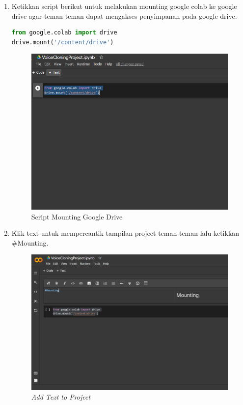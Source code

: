 \begin{enumerate}
\item Ketikkan script berikut untuk melakukan mounting google colab ke google drive agar teman-teman dapat mengakses penyimpanan pada google drive.
\begin{lstlisting}[language=Python, caption=Mounting Google Drive]
from google.colab import drive
drive.mount('/content/drive')
\end{lstlisting}

\begin{figure}[H]
    \centering
    \includegraphics[scale=0.35]{figures/colab3}
    \caption{Script Mounting Google Drive}
    \label{colab3}
\end{figure}

\item Klik text untuk mempercantik tampilan project teman-teman lalu ketikkan \#Mounting.
\begin{figure}[H]
    \centering
    \includegraphics[scale=0.3]{figures/colab4}
    \caption{\textit{Add Text to Project}}
    \label{colab4}
\end{figure}


\end{enumerate}

